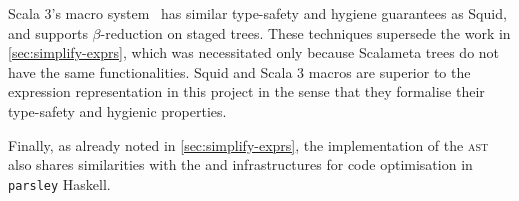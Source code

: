 \documentclass[../../main.tex]{subfiles}
\begin{document}
Scala 3's macro system~\cite{stucki_multi-stage_2021} has similar type-safety and hygiene guarantees as Squid, and supports $\beta$-reduction on staged  trees.
These techniques supersede the work in \cref{sec:simplify-exprs}, which was necessitated only because Scalameta trees do not have the same functionalities.
Squid and Scala 3 macros are superior to the expression representation in this project in the sense that they formalise their type-safety and hygienic properties.

Finally, as already noted in \cref{sec:simplify-exprs}, the implementation of the  \textsc{ast} also shares similarities with the  and  infrastructures for code optimisation in \texttt{parsley} Haskell.

\end{document}

